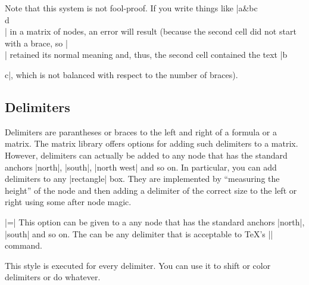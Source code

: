 Note that this system is not fool-proof. If you write things like
|a&b{c\\d}\\| in a matrix of nodes, an error will result (because the
second cell did not start with a brace, so |\\| retained its normal
meaning and, thus, the second cell contained the text |b{c|, which is
not balanced with respect to the number of braces).

\subsection{Delimiters}

Delimiters are parantheses or braces to the left and right of a
formula or a matrix. The matrix library offers options for adding such
delimiters to a matrix. However, delimiters can actually be added to
any node that has the standard anchors |north|, |south|, |north west|
and so on. In particular, you can add delimiters to any |rectangle|
box. They are implemented by ``measuring the height'' of the node and
then adding a delimiter of the correct size to the left or right using
some after node magic.

\begin{itemize}
  |=|
  This option can be given to a any node that has the standard anchors
  |north|, |south| and so on. The  can be any
  delimiter that is acceptable to \TeX's |\left| command.
\begin{codeexample}[]
\end{codeexample}

\begin{codeexample}[]
\end{codeexample}

  This style is executed for every delimiter. You can use it to shift
  or color delimiters or do whatever.


\end{itemize}}

